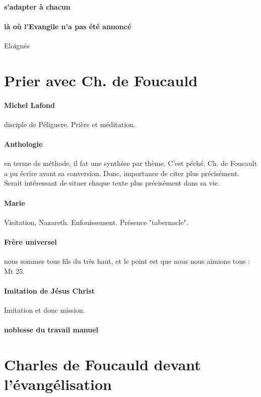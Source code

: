 \paragraph{s'adapter à chacun}
\paragraph{là où l'Evangile n'a pas été annoncé} 
Eloignés

\section{Prier avec Ch. de Foucauld}

\paragraph{Michel Lafond} disciple de Péliguere. Prière et méditation. 

\paragraph{Anthologie} en terme de méthode, il fat une synthèse par thème. C'est péché. Ch. de Foucault a pu écrire avant sa conversion. Donc, importance de citer plus précisément. Serait intéressant de situer chaque texte plus précisément dans sa vie.

\paragraph{Marie} Visitation, Nazareth. Enfouissement. Présence "tabernacle".

\paragraph{Frère universel} nous sommes tous fils du très haut, et le point est que nous nous aimions tous : Mt 25. 

\paragraph{Imitation de Jésus Christ} Imitation et donc mission. 


\paragraph{noblesse du travail manuel}

\section{Charles de Foucauld devant l'évangélisation}


